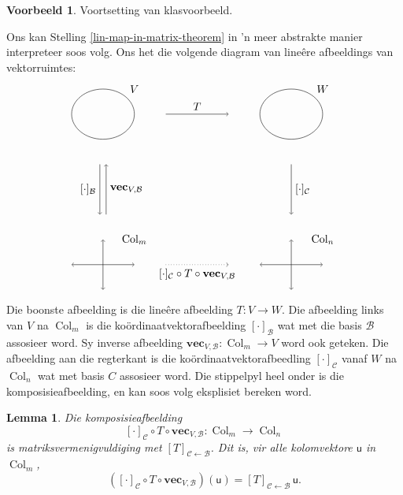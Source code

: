 \documentclass[a4paper,11pt]{book}
\newtheorem{lemma}[theorem]{Lemma}
\theoremstyle{definition}
\newtheorem{example_environment}{Voorbeeld}[chapter]
\newcommand{\ve}[1]{\mathbf{#1}}
\newcommand{\mat}[1]{\mathsf{#1}}
\newcommand{\basis}[1]{{\mathcal #1}}
\newenvironment{example}
	{
		\begin{oframed}
		\begin{example_environment}
	}
	{
		\end{example_environment}
		\end{oframed}
	}
\DeclareMathOperator{\Col}{Col}
\begin{document}
\begin{example} Voortsetting van klasvoorbeeld.
\end{example}


Ons kan Stelling \ref{lin-map-in-matrix-theorem} in 'n meer abstrakte
manier interpreteer soos
volg. Ons het die volgende diagram van line{\^e}re afbeeldings van
vektorruimtes:
\[
	\begin{tikzpicture}[yscale=0.8]
		\draw (0, 0) circle (1);
		\draw (6,0) circle (1);
		\draw [<->] (-1, -6) -- (1, -6);
		\draw [<->] (0, -5) -- (0, -7);
		\draw [<->] (5, -6) -- (7, -6);
		\draw [<->] (6, -5) -- (6, -7);
		\draw[->] (2, 0) -- node[above]{$T$} (4, 0);
		\draw[->] (6, -2) -- node[right] {$[ \cdot ]_\basis{C}$} (6, -4);
		\draw[->, dotted] (2, -6) -- node[below] {$[\cdot]_\basis{C} \circ
		T \circ \ve{vec}_{V, \basis{B}}$} (4, -6);
		\draw[->] (-0.1, -2) -- node[left] {$[ \cdot ]_\basis{B}$} (-0.1,
		-4);
		\draw[<-] (0.1, -2) -- node[right] {$\ve{vec}_{V, \basis{B}}$}
		(0.1, -4);
		\node at (1, 1) {$V$};
		\node at (7, 1) {$W$};
		\node at (1, -5) {$\Col_m$};
		\node at (7, -5) {$\Col_n$};	
	\end{tikzpicture}
\]
Die boonste afbeelding is die line{\^e}re afbeelding $T : V \rightarrow W$.
Die afbeelding links van $V$ na $\Col_m$ is die
ko{\"o}rdinaatvektorafbeelding $[ \cdot ]_\basis{B}$ wat met die basis
$\basis{B}$ assosieer word. Sy inverse afbeelding $\ve{vec}_{V, \basis{B}}
: \Col_m \rightarrow V$ word ook geteken. Die afbeelding aan die regterkant
is die ko{\"o}rdinaatvektorafbeedling $[ \cdot]_\basis{C}$ vanaf $W$ na
$\Col_n$ wat met basis $C$ assosieer word. Die stippelpyl heel onder is die
komposisieafbeelding, en kan soos volg eksplisiet bereken word. 
\begin{lemma} Die komposisieafbeelding
	\[
		[\cdot]_\basis{C} \circ T \circ \ve{vec}_{V, \basis{B}} : \Col_m
		\rightarrow \Col_n 
	\]
	is matriksvermenigvuldiging met $[T]_{\basis{C} \leftarrow \basis{B}}$.
	Dit is, vir alle kolomvektore $\mat{u}$ in $\Col_m$,
	\[
		\left( [\cdot]_\basis{C} \circ T \circ \ve{vec}_{V, \basis{B}}
		\right) (\mat{u}) = [T]_{\basis{C} \leftarrow \basis{B}} \,
		\mat{u}.
	\]
\end{lemma}
\end{document}
